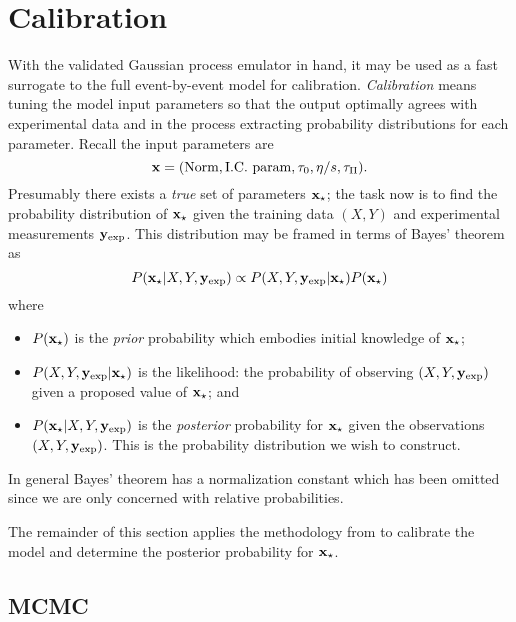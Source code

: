 \documentclass[aps,prc,reprint,superscriptaddress,amsmath]{revtex4-1}
\begin{document}
\section{Calibration}

\newcommand{\xs}{\x_\star}
\newcommand{\z}{\mathbf z}
\newcommand{\yexp}{\y_\text{exp}}
\newcommand{\zexp}{\z_\text{exp}}

With the validated Gaussian process emulator in hand, it may be used as a fast surrogate to the full event-by-event model for calibration.
\emph{Calibration} means tuning the model input parameters so that the output optimally agrees with experimental data and in the process extracting probability distributions for each parameter.
Recall the input parameters are
\begin{equation*}
  \mathbf x = (\text{Norm}, \text{I.C.\ param}, \tau_0, \eta/s, \tau_\Pi).
\end{equation*}
Presumably there exists a \emph{true} set of parameters $\xs$; the task now is to find the probability distribution of $\xs$ given the training data $(X, Y)$ and experimental measurements $\yexp$.
This distribution may be framed in terms of Bayes' theorem as
\begin{equation}
  P(\xs|X,Y,\yexp) \propto P(X,Y,\yexp|\xs) P(\xs)
\end{equation}
where
\begin{itemize}
  \item $P(\xs)$ is the \emph{prior} probability which embodies initial knowledge of $\xs$;
  \item $P(X,Y,\yexp|\xs)$ is the likelihood:
    the probability of observing $(X, Y, \yexp)$ given a proposed value of $\xs$; and
  \item $P(\xs|X,Y,\yexp)$ is the \emph{posterior} probability for $\xs$ given the observations $(X, Y, \yexp)$.
    This is the probability distribution we wish to construct.
\end{itemize}
In general Bayes' theorem has a normalization constant which has been omitted since we are only concerned with relative probabilities.

The remainder of this section applies the methodology from \cite{OHagan:2006ba,Higdon:2008cmc,Higdon:2014tva} to calibrate the model and determine the posterior probability for $\xs$.

\subsection{MCMC}
\end{document}
